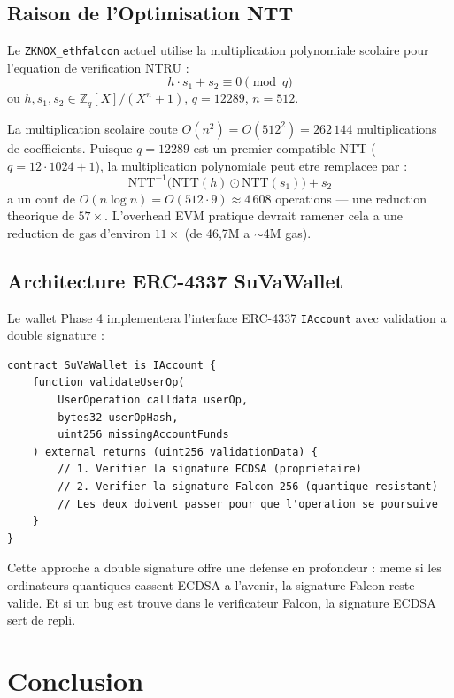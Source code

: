 \documentclass[11pt,a4paper]{article}
\begin{document}
\subsection{Raison de l'Optimisation NTT}

Le \texttt{ZKNOX\_ethfalcon} actuel utilise la multiplication polynomiale scolaire pour
l'equation de verification NTRU :
\[
  h \cdot s_1 + s_2 \equiv 0 \pmod{q}
\]
ou $h, s_1, s_2 \in \mathbb{Z}_q[X]/(X^n + 1)$, $q = 12289$, $n = 512$.

La multiplication scolaire coute $O(n^2) = O(512^2) = 262\,144$ multiplications de coefficients.
Puisque $q = 12289$ est un premier compatible NTT ($q = 12 \cdot 1024 + 1$), la multiplication
polynomiale peut etre remplacee par :
\[
  \text{NTT}^{-1}\bigl(\text{NTT}(h) \odot \text{NTT}(s_1)\bigr) + s_2
\]
a un cout de $O(n \log n) = O(512 \cdot 9) \approx 4\,608$ operations ---
une reduction theorique de $57\times$. L'overhead EVM pratique devrait ramener cela a
une reduction de gas d'environ $11\times$ (de 46,7M a $\sim$4M gas).

\subsection{Architecture ERC-4337 SuVaWallet}

Le wallet Phase 4 implementera l'interface ERC-4337 \texttt{IAccount} avec validation
a double signature :

\begin{lstlisting}[style=solidity, caption={Interface SuVaWallet.sol (apercu Phase 4)}]
contract SuVaWallet is IAccount {
    function validateUserOp(
        UserOperation calldata userOp,
        bytes32 userOpHash,
        uint256 missingAccountFunds
    ) external returns (uint256 validationData) {
        // 1. Verifier la signature ECDSA (proprietaire)
        // 2. Verifier la signature Falcon-256 (quantique-resistant)
        // Les deux doivent passer pour que l'operation se poursuive
    }
}
\end{lstlisting}

Cette approche a double signature offre une defense en profondeur : meme si les ordinateurs
quantiques cassent ECDSA a l'avenir, la signature Falcon reste valide. Et si un bug est
trouve dans le verificateur Falcon, la signature ECDSA sert de repli.

\section{Conclusion}
\end{document}
